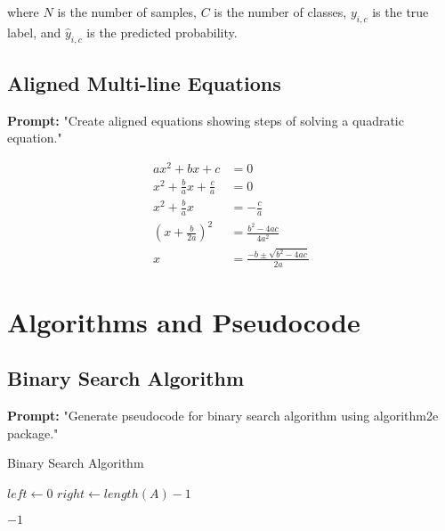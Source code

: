 \documentclass[12pt, a4paper]{article}
\begin{document}
where $N$ is the number of samples, $C$ is the number of classes, $y_{i,c}$ is the true label, and $\hat{y}_{i,c}$ is the predicted probability.

\subsection{Aligned Multi-line Equations}

\textbf{Prompt:} "Create aligned equations showing steps of solving a quadratic equation."

\begin{align}
    ax^2 + bx + c &= 0 \\
    x^2 + \frac{b}{a}x + \frac{c}{a} &= 0 \\
    x^2 + \frac{b}{a}x &= -\frac{c}{a} \\
    \left(x + \frac{b}{2a}\right)^2 &= \frac{b^2 - 4ac}{4a^2} \\
    x &= \frac{-b \pm \sqrt{b^2 - 4ac}}{2a}
    \label{eq:quadratic}
\end{align}

\section{Algorithms and Pseudocode}

\subsection{Binary Search Algorithm}

\textbf{Prompt:} "Generate pseudocode for binary search algorithm using algorithm2e package."

\begin{algorithm}[h]
    \caption{Binary Search Algorithm}
    \label{alg:binarysearch}
    
    $left \gets 0$\;
    $right \gets length(A) - 1$\;
    
    
    \Return $-1$\;
\end{algorithm}
\end{document}
